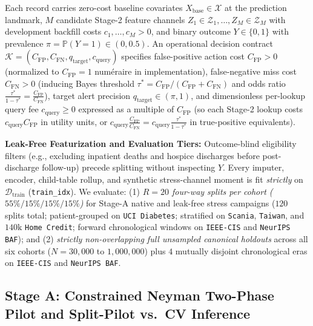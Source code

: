 \documentclass[11pt]{article}
\theoremstyle{remark}
\begin{document}
Each record carries zero-cost baseline covariates $X_{\text{base}} \in \mathcal{X}$ at the prediction landmark, $M$ candidate Stage-2 feature channels $Z_1 \in \mathcal{Z}_1, \dots, Z_M \in \mathcal{Z}_M$ with development backfill costs $c_1, \dots, c_M > 0$, and binary outcome $Y \in \{0,1\}$ with prevalence $\pi = \mathbb{P}(Y=1) \in (0, 0.5)$. An operational decision contract $\mathcal{K} = (C_{\text{FP}}, C_{\text{FN}}, q_{\text{target}}, c_{\text{query}})$ specifies false-positive action cost $C_{\text{FP}} > 0$ (normalized to $C_{\text{FP}} = 1$ num\'eraire in implementation), false-negative miss cost $C_{\text{FN}} > 0$ (inducing Bayes threshold $\tau^* = C_{\text{FP}} / (C_{\text{FP}} + C_{\text{FN}})$ and odds ratio $\frac{\tau^*}{1 - \tau^*} = \frac{C_{\text{FP}}}{C_{\text{FN}}}$), target alert precision $q_{\text{target}} \in (\pi, 1)$, and dimensionless per-lookup query fee $c_{\text{query}} \ge 0$ expressed as a multiple of $C_{\text{FP}}$ (so each Stage-2 lookup costs $c_{\text{query}} C_{\text{FP}}$ in utility units, or $c_{\text{query}} \frac{C_{\text{FP}}}{C_{\text{FN}}} = c_{\text{query}} \frac{\tau^*}{1-\tau^*}$ in true-positive equivalents).

\textbf{Leak-Free Featurization and Evaluation Tiers:} Outcome-blind eligibility filters (e.g., excluding inpatient deaths and hospice discharges before post-discharge follow-up) precede splitting without inspecting $Y$. Every imputer, encoder, child-table rollup, and synthetic stress-channel moment is fit \emph{strictly} on $\mathcal{D}_{\text{train}}$ (\texttt{train\_idx}). We evaluate: (1) \emph{$R = 20$ four-way splits per cohort ($55\%/15\%/15\%/15\%$)} for Stage-A native and leak-free stress campaigns ($120$ splits total; patient-grouped on \texttt{UCI Diabetes}; stratified on \texttt{Scania}, \texttt{Taiwan}, and $140\text{k}$ \texttt{Home Credit}; forward chronological windows on \texttt{IEEE-CIS} and \texttt{NeurIPS BAF}); and (2) \emph{strictly non-overlapping full unsampled canonical holdouts} across all six cohorts ($N = 30{,}000$ to $1{,}000{,}000$) plus $4$ mutually disjoint chronological eras on \texttt{IEEE-CIS} and \texttt{NeurIPS BAF}.

\subsection{Stage A: Constrained Neyman Two-Phase Pilot and Split-Pilot vs.\ CV Inference}
\label{sec:stage_a}
\end{document}
